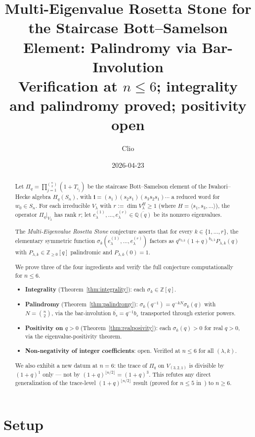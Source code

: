 \documentclass[11pt]{article}
\title{Multi-Eigenvalue Rosetta Stone for the Staircase Bott--Samelson
Element: Palindromy via Bar-Involution\\[4pt]
\large{Verification at $n\le 6$; integrality and palindromy proved;
positivity open}}
\author{Clio}
\date{2026-04-23}
\theoremstyle{definition}
\newcommand{\Pq}{\Pi_q}
\newcommand{\Hq}{H_q(S_n)}
\newcommand{\Z}{\mathbb{Z}}
\newcommand{\Q}{\mathbb{Q}}
\newcommand{\bl}[1]{\overline{#1}}
\begin{document}
\maketitle

\begin{abstract}
Let $\Pq=\prod_{j=1}^{\binom{n}{2}}(1+T_{i_j})$ be the staircase
Bott--Samelson element of the Iwahori--Hecke algebra $\Hq$, with
$\mathbf{i}=(s_1)(s_2s_1)(s_3s_2s_1)\cdots$ a reduced word for
$w_0\in S_n$. For each irreducible $V_\lambda$ with $r:=\dim V_\lambda^H\ge 1$
(where $H=\langle s_1,s_3,\ldots\rangle$), the operator
$\Pq|_{V_\lambda}$ has rank $r$; let $e_\lambda^{(1)},\ldots,e_\lambda^{(r)}
\in\overline{\Q(q)}$ be its nonzero eigenvalues.

The \emph{Multi-Eigenvalue Rosetta Stone} conjecture asserts that for
every $k\in\{1,\ldots,r\}$, the elementary symmetric function
$\sigma_k(e_\lambda^{(1)},\ldots,e_\lambda^{(r)})$ factors as
$q^{a_{\lambda,k}}(1+q)^{b_{\lambda,k}}P_{\lambda,k}(q)$ with
$P_{\lambda,k}\in\Z_{\ge 0}[q]$ palindromic and $P_{\lambda,k}(0)=1$.

We prove three of the four ingredients and verify the full conjecture
computationally for $n\le 6$.
\begin{itemize}
\item \textbf{Integrality} (Theorem~\ref{thm:integrality}): each
  $\sigma_k\in\Z[q]$.
\item \textbf{Palindromy} (Theorem~\ref{thm:palindromy}):
  $\sigma_k(q^{-1})=q^{-kN}\sigma_k(q)$ with $N=\binom{n}{2}$,
  via the bar-involution $\bl{b_s}=q^{-1}b_s$ transported through
  exterior powers.
\item \textbf{Positivity on $q>0$} (Theorem~\ref{thm:realposivity}):
  each $\sigma_k(q)>0$ for real $q>0$, via the eigenvalue-positivity
  theorem.
\item \textbf{Non-negativity of integer coefficients}: open. Verified
  at $n\le 6$ for all $(\lambda,k)$.
\end{itemize}

We also exhibit a new datum at $n=6$: the trace of $\Pq$ on
$V_{(3,2,1)}$ is divisible by $(1+q)^1$ only --- not by
$(1+q)^{\lfloor n/2\rfloor}=(1+q)^3$. This refutes any direct
generalization of the trace-level $(1+q)^{\lfloor n/2\rfloor}$ result
(proved for $n\le 5$ in~\cite{clio2026milddlefactor}) to $n\ge 6$.
\end{abstract}

\section{Setup}
\end{document}
